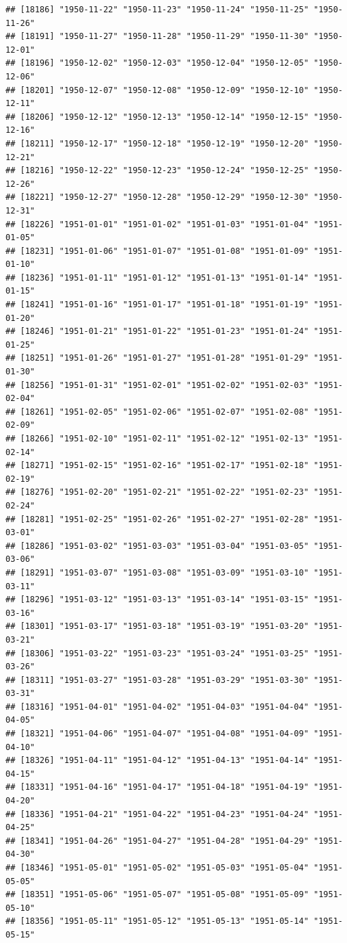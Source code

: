 \documentclass{article}\usepackage[]{graphicx}\usepackage[]{color}
\makeatletter
\newenvironment{kframe}{%
 \def\at@end@of@kframe{}%
 \ifinner\ifhmode%
  \def\at@end@of@kframe{\end{minipage}}%
  \begin{minipage}{\columnwidth}%
 \fi\fi%
 \def\FrameCommand##1{\hskip\@totalleftmargin \hskip-\fboxsep
 \colorbox{shadecolor}{##1}\hskip-\fboxsep
     \hskip-\linewidth \hskip-\@totalleftmargin \hskip\columnwidth}%
 \MakeFramed {\advance\hsize-\width
   \@totalleftmargin\z@ \linewidth\hsize
   \@setminipage}}%
 {\par\unskip\endMakeFramed%
 \at@end@of@kframe}
\newenvironment{knitrout}{}{} %
\makeatother
\begin{document}
\begin{description}
\begin{knitrout}
\begin{kframe}
\begin{verbatim}
## [18186] "1950-11-22" "1950-11-23" "1950-11-24" "1950-11-25" "1950-11-26"
## [18191] "1950-11-27" "1950-11-28" "1950-11-29" "1950-11-30" "1950-12-01"
## [18196] "1950-12-02" "1950-12-03" "1950-12-04" "1950-12-05" "1950-12-06"
## [18201] "1950-12-07" "1950-12-08" "1950-12-09" "1950-12-10" "1950-12-11"
## [18206] "1950-12-12" "1950-12-13" "1950-12-14" "1950-12-15" "1950-12-16"
## [18211] "1950-12-17" "1950-12-18" "1950-12-19" "1950-12-20" "1950-12-21"
## [18216] "1950-12-22" "1950-12-23" "1950-12-24" "1950-12-25" "1950-12-26"
## [18221] "1950-12-27" "1950-12-28" "1950-12-29" "1950-12-30" "1950-12-31"
## [18226] "1951-01-01" "1951-01-02" "1951-01-03" "1951-01-04" "1951-01-05"
## [18231] "1951-01-06" "1951-01-07" "1951-01-08" "1951-01-09" "1951-01-10"
## [18236] "1951-01-11" "1951-01-12" "1951-01-13" "1951-01-14" "1951-01-15"
## [18241] "1951-01-16" "1951-01-17" "1951-01-18" "1951-01-19" "1951-01-20"
## [18246] "1951-01-21" "1951-01-22" "1951-01-23" "1951-01-24" "1951-01-25"
## [18251] "1951-01-26" "1951-01-27" "1951-01-28" "1951-01-29" "1951-01-30"
## [18256] "1951-01-31" "1951-02-01" "1951-02-02" "1951-02-03" "1951-02-04"
## [18261] "1951-02-05" "1951-02-06" "1951-02-07" "1951-02-08" "1951-02-09"
## [18266] "1951-02-10" "1951-02-11" "1951-02-12" "1951-02-13" "1951-02-14"
## [18271] "1951-02-15" "1951-02-16" "1951-02-17" "1951-02-18" "1951-02-19"
## [18276] "1951-02-20" "1951-02-21" "1951-02-22" "1951-02-23" "1951-02-24"
## [18281] "1951-02-25" "1951-02-26" "1951-02-27" "1951-02-28" "1951-03-01"
## [18286] "1951-03-02" "1951-03-03" "1951-03-04" "1951-03-05" "1951-03-06"
## [18291] "1951-03-07" "1951-03-08" "1951-03-09" "1951-03-10" "1951-03-11"
## [18296] "1951-03-12" "1951-03-13" "1951-03-14" "1951-03-15" "1951-03-16"
## [18301] "1951-03-17" "1951-03-18" "1951-03-19" "1951-03-20" "1951-03-21"
## [18306] "1951-03-22" "1951-03-23" "1951-03-24" "1951-03-25" "1951-03-26"
## [18311] "1951-03-27" "1951-03-28" "1951-03-29" "1951-03-30" "1951-03-31"
## [18316] "1951-04-01" "1951-04-02" "1951-04-03" "1951-04-04" "1951-04-05"
## [18321] "1951-04-06" "1951-04-07" "1951-04-08" "1951-04-09" "1951-04-10"
## [18326] "1951-04-11" "1951-04-12" "1951-04-13" "1951-04-14" "1951-04-15"
## [18331] "1951-04-16" "1951-04-17" "1951-04-18" "1951-04-19" "1951-04-20"
## [18336] "1951-04-21" "1951-04-22" "1951-04-23" "1951-04-24" "1951-04-25"
## [18341] "1951-04-26" "1951-04-27" "1951-04-28" "1951-04-29" "1951-04-30"
## [18346] "1951-05-01" "1951-05-02" "1951-05-03" "1951-05-04" "1951-05-05"
## [18351] "1951-05-06" "1951-05-07" "1951-05-08" "1951-05-09" "1951-05-10"
## [18356] "1951-05-11" "1951-05-12" "1951-05-13" "1951-05-14" "1951-05-15"

\end{verbatim}
\end{kframe}
\end{knitrout}
\end{description}
\end{document}

